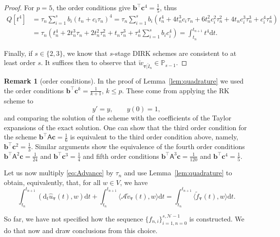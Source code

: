 \documentclass{amsart}
\newcommand{\bftau}{{\boldsymbol{\tau}}}
\newcommand{\msfA}{\mathsf{A}}
\newcommand{\mclA}{\mathcal{A}}
\newcommand{\mclN}{\mathcal{N}}
\newcommand{\bfb}{\boldsymbol{b}}
\newcommand{\bfc}{\boldsymbol{c}}
\newcommand{\mbbP}{\mathbb{P}}
\theoremstyle{definition}
\newtheorem{remark}{Remark}[section]
\newcommand{\diff}{\mathrm{d}}
\newcommand{\AJS}[1]{#1}
\begin{document}
\begin{proof}
  For $p=5$, the order conditions give $\bfb^\top \bfc^4 = \frac{1}{5}$, thus
     \begin{align*}
    Q[t^4] & = \tau_n \sum_{i=1}^s b_i (t_n + c_i \tau_n)^4 = \tau_n \sum_{i=1}^s b_i \left( t_n^4 + 4 t_n^3 c_i \tau_n + 6 t_n^2 c_i^2 \tau_n^2 + 4 t_n c_i^3\tau_n^3 + c_i^4 \tau_n^4\right) \\
    & = \tau_n \left(t_n^4 + 2t_n^3 \tau_n + 2 t_n^2 \tau_n^2 + t_n \tau_n^3 +\tau_n^4 \sum_{i=1}^s b_i c_i^4 \right) = \int_{t_n}^{t_{n+1}} t^4 \diff t.
  \end{align*}
  
  Finally, if $s \in \{2,3\}$, we know that $s$-stage DIRK schemes are consistent to at least order $s$. It suffices then to observe that $\tilde{w}_{\bftau|\mathring{I}_n} \in \mbbP_{s-1}$.
\end{proof}

\begin{remark}[\AJS{order conditions}]
  In the proof of Lemma~\ref{lem:quadrature} we used the order conditions $\bfb^\top \bfc^k = \frac{1}{k+1}$, $k \leq p$. These come from applying the RK scheme to
  \[
    y' = y, \qquad y(0) = 1,
  \]
  and comparing the solution of the scheme with the coefficients of the Taylor expansions of the exact solution. One can show that the third order condition for the scheme $\bfb^\top \msfA \bfc = \frac{1}{6}$ is equivalent to the third order condition above, namely, $\bfb^\top \bfc^2 = \tfrac13$. Similar arguments show the equivalence of the fourth order conditions $\bfb^\top \msfA^2 \bfc = \frac{1}{24}$ and $\bfb^\top \bfc^3 =\frac{1}{4}$ and fifth order conditions $\bfb^\top \msfA^3 \bfc = \frac{1}{120}$ and $\bfb^\top \bfc^4 = \frac{1}{5}$.
\end{remark}


Let us now multiply \eqref{eq:Advance} by $\tau_n$ and use Lemma~\ref{lem:quadrature} to obtain, equivalently, that, for all $w \in V$, we have
\begin{equation}
\label{eq:AdvaceIntLoc}
  \int_{t_n}^{t_{n+1}} \left( \diff_t \hat{u}_\bftau(t), w \right) \diff t + \int_{t_n}^{t_{n+1}} \langle \mclA \tilde{v}_\bftau(t), w \rangle \diff t = \int_{t_n}^{t_{n+1}} \langle \tilde{f}_\bftau(t), w \rangle \diff t.
\end{equation}

So far, we have not specified how the sequence $\{f_{n,i} \}_{i=1,n=0}^{s,\mclN-1}$ is constructed. We do that now and draw conclusions from this choice.
\end{document}
